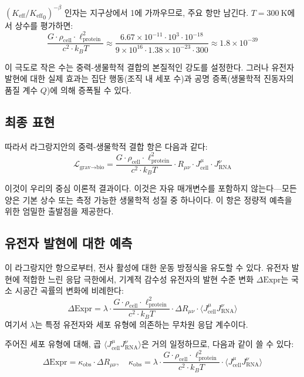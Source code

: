 \documentclass[12pt,a4paper]{article}
\theoremstyle{remark}
\newcommand{\Keff}{K_{\mathrm{eff}}}
\begin{document}
	\((\Keff/{\Keff}_0)^{-\beta}\) 인자는 지구상에서 1에 가까우므로, 주요 항만 남긴다. \(T = 300\ \mathrm{K}\)에서 상수를 평가하면:
	\[
	\frac{G \cdot \rho_{\text{cell}} \cdot \ell_{\text{protein}}^2}{c^2 \cdot k_B T} \approx \frac{6.67\times 10^{-11} \cdot 10^3 \cdot 10^{-18}}{9\times 10^{16} \cdot 1.38\times 10^{-23} \cdot 300} \approx 1.8 \times 10^{-39}
	\]
	
	이 극도로 작은 수는 중력-생물학적 결합의 본질적인 강도를 설정한다. 그러나 유전자 발현에 대한 실제 효과는 집단 행동(조직 내 세포 수)과 공명 증폭(생물학적 진동자의 품질 계수 \(Q\))에 의해 증폭될 수 있다.
	
	\subsection{최종 표현}
	
	따라서 라그랑지안의 중력-생물학적 결합 항은 다음과 같다:
	\begin{equation}
		\boxed{ \mathcal{L}_{\text{grav}\to\text{bio}} = \frac{G \cdot \rho_{\text{cell}} \cdot \ell_{\text{protein}}^2}{c^2 \cdot k_B T} \cdot R_{\mu\nu} \cdot J_{\text{cell}}^\mu \cdot J_{\text{RNA}}^\nu }
		\label{eq:final}
	\end{equation}
	
	이것이 우리의 중심 이론적 결과이다. 이것은 자유 매개변수를 포함하지 않는다—모든 양은 기본 상수 또는 측정 가능한 생물학적 성질 중 하나이다. 이 항은 정량적 예측을 위한 엄밀한 출발점을 제공한다.
	
	\subsection{유전자 발현에 대한 예측}
	
	이 라그랑지안 항으로부터, 전사 활성에 대한 운동 방정식을 유도할 수 있다. 유전자 발현에 적합한 느린 응답 극한에서, 기계적 감수성 유전자의 발현 수준 변화 \(\Delta\text{Expr}\)는 국소 시공간 곡률의 변화에 비례한다:
	\begin{equation}
		\Delta\text{Expr} = \lambda \cdot \frac{G \cdot \rho_{\text{cell}} \cdot \ell_{\text{protein}}^2}{c^2 \cdot k_B T} \cdot \Delta R_{\mu\nu} \cdot \langle J_{\text{cell}}^\mu J_{\text{RNA}}^\nu \rangle
		\label{eq:prediction-raw}
	\end{equation}
	여기서 \(\lambda\)는 특정 유전자와 세포 유형에 의존하는 무차원 응답 계수이다.
	
	주어진 세포 유형에 대해, 곱 \(\langle J_{\text{cell}}^\mu J_{\text{RNA}}^\nu \rangle\)은 거의 일정하므로, 다음과 같이 쓸 수 있다:
	\begin{equation}
		\Delta\text{Expr} = \kappa_{\text{obs}} \cdot \Delta R_{\mu\nu}, \quad 
		\kappa_{\text{obs}} = \lambda \cdot \frac{G \cdot \rho_{\text{cell}} \cdot \ell_{\text{protein}}^2}{c^2 \cdot k_B T} \cdot \langle J_{\text{cell}}^\mu J_{\text{RNA}}^\nu \rangle
		\label{eq:prediction-simple}
	\end{equation}
	
\end{document}

